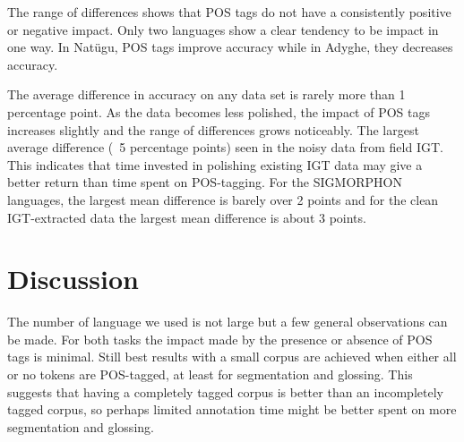 The range of differences shows that POS tags do not have a consistently positive or negative impact. Only two languages show a clear tendency to be impact in one way. In Nat\"ugu, POS tags improve accuracy while in Adyghe, they decreases accuracy. 

The average difference in accuracy on any data set is rarely more than 1 percentage point. As the data becomes less polished, the impact of POS tags increases slightly and the range of differences grows noticeably. The largest average difference (~5 percentage points) seen in the noisy data from field IGT. This indicates that time invested in polishing existing IGT data may give a better return than time spent on POS-tagging. For the SIGMORPHON languages, the largest mean difference is barely over 2 points and for the clean IGT-extracted data the largest mean difference is about 3 points. 



\section{Discussion}
\label{sec:discussion}

The number of language we used is not large but a few general observations can be made. For both tasks the impact made by the presence or absence of POS tags is minimal. 
Still best results with a small corpus are achieved when either all or no tokens are POS-tagged, at least for segmentation and glossing. This suggests that having a completely tagged corpus is better than an incompletely tagged corpus, so perhaps limited annotation time might be better spent on more segmentation and glossing. 

